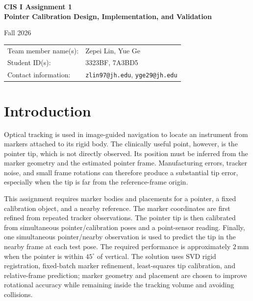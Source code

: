 \documentclass[11pt]{article}
\begin{document}
\begin{titlepage}
\centering
\vspace*{1.5cm}
{\LARGE\bfseries CIS I Assignment 1\\[0.4cm]
Pointer Calibration Design, Implementation, and Validation\par}
\vspace{1.5cm}
{\large Fall 2026\par}
\vfill
\begin{tabular}{p{}p{}}
Team member name(s): & Zepei Lin, Yue Ge \\[0.8cm]
Student ID(s): & 3323BF, 7A3BD5 \\[0.8cm]
Contact information: & \texttt{zlin97@jh.edu}, \texttt{yge29@jh.edu}
\end{tabular}
\vfill
\noindent{}
\vfill
\end{titlepage}

\tableofcontents
\clearpage

\section{Introduction}
Optical tracking is used in image-guided navigation to locate an instrument
from markers attached to its rigid body.  The clinically useful point,
however, is the pointer tip, which is not directly observed.  Its position
must be inferred from the marker geometry and the estimated pointer frame.
Manufacturing errors, tracker noise, and small frame rotations can therefore
produce a substantial tip error, especially when the tip is far from the
reference-frame origin.

This assignment requires marker bodies and placements for a pointer, a fixed
calibration object, and a nearby reference.  The marker coordinates are first
refined from repeated tracker observations.  The pointer tip is then calibrated
from simultaneous pointer/calibration poses and a point-sensor reading.
Finally, one simultaneous pointer/nearby observation is used to predict the tip
in the nearby frame at each test pose.  The required performance is
approximately $2\,\mathrm{mm}$ when the pointer is within $45^\circ$ of
vertical.  The solution uses SVD rigid registration, fixed-batch marker
refinement, least-squares tip calibration, and relative-frame prediction;
marker geometry and placement are chosen to improve rotational accuracy while
remaining inside the tracking volume and avoiding collisions\cite{assignment,repo}.
\end{document}
